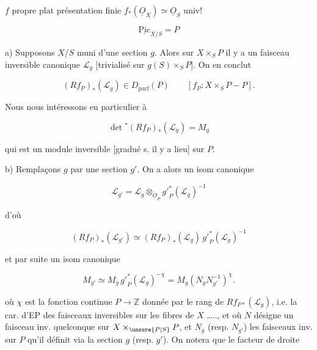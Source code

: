 

$f$ propre plat présentation finie \quad $f_*(\underline O_X)\simeq\underline O_S$ univ!


\[
\underline{\mathrm{Pic}}_{X/S}=P
\]

a) Supposons $X/S$ muni d'une section $g$. Alors sur $X\times_S P$ il y a un faisceau inversible canonique $\mathcal L_g$ [trivialisé sur $g(S)\times_S P$]. On en conclut

\[
(Rf_P)_*(\mathcal L_g)\in D_{\mathrm{parf}}(P)
\qquad [f_P:X\times_S P\mathbin{-}P].
\]

Nous nous intéressons en particulier à


\[
\det{}^{*}(Rf_P)_*(\mathcal L_g)=M_g
\]

qui est un module inversible [gradué s. il y a lieu] sur $P$.

b) Remplaçons $g$ par une section $g'$. On a alors un isom canonique

\[
\mathcal L_{g'}=\mathcal L_g\otimes_{\underline O_P}{g'}_P^{*}(\mathcal L_g)^{-1}
\]

d'où

\[
(Rf_P)_*(\mathcal L_{g'})\simeq(Rf_P)_*(\mathcal L_g)\,{g'}_P^{*}(\mathcal L_g)^{-1}
\]

et par suite un isom canonique

\[
M_{g'}\simeq M_g\,{g'}_P^{*}(\mathcal L_g)^{-\chi}=M_g\left(N_gN_{g'}^{-1}\right)^{\chi}.\tag*{(*)}
\]

où $\chi$ est la fonction continue $P\longrightarrow\mathbb Z$ donnée par le rang de $Rf_{P*}(\mathcal L_g)$, i.e. la car. d'EP des faisceaux inversibles sur les fibres de $X$ \ldots.., et où $N$ désigne un faisceau inv.  quelconque sur $X\times_{\unsure{P|S}}P$, et $N_g$ (resp. $N_{g'}$) les faisceaux inv. sur $P$ qu'il définit via la section $g$ (resp. $g'$). On notera que le facteur de droite

